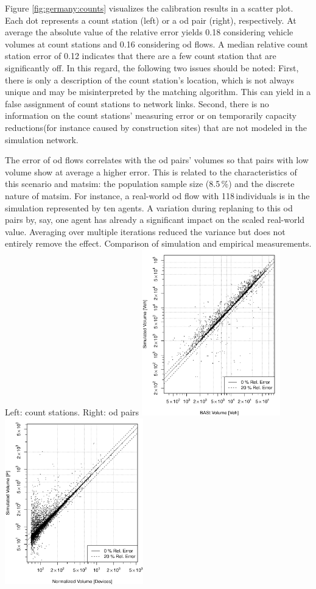 Figure \ref{fig:germany:counts} visualizes the calibration results in a scatter plot. Each dot represents a count station (left) or a \gls{od} pair (right), respectively. At average the absolute value of the relative error yields 0.18 considering vehicle volumes at count stations and 0.16 considering \gls{od} flows. A median relative count station error of 0.12 indicates that there are a few count station that are significantly off. In this regard, the following two issues should be noted: First, there is only a description of the count station's location, which is not always unique and may be misinterpreted by the matching algorithm. This can yield in a false assignment of count stations to network links. Second, there is no information on the count stations' measuring error or on temporarily capacity reductions(for instance caused by construction sites) that are not modeled in the simulation network.

The error of \gls{od} flows correlates with the \gls{od} pairs' volumes so that pairs with low volume show at average a higher error. This is related to the characteristics of this scenario and \gls{matsim}: the population sample size (8.5\,\%) and the discrete nature of \gls{matsim}. For instance, a real-world \gls{od} flow with 118\,individuals is in the simulation represented by ten agents. A variation during replaning to this \gls{od} pairs by, say, one agent has already a significant impact on the scaled real-world value. Averaging over multiple iterations reduced the variance but does not entirely remove the effect.
\createfigure%
{}%
{Comparison of simulation and empirical measurements. Left: count stations. Right: \gls{od} pairs}%
{\label{fig:germany:counts}}%
{\includegraphics[width=0.45\textwidth, angle=0]{./scenarios/figures/germany-counts}\includegraphics[width=0.45\textwidth, angle=0]{./scenarios/figures/germany-odcounts}}%
{}



